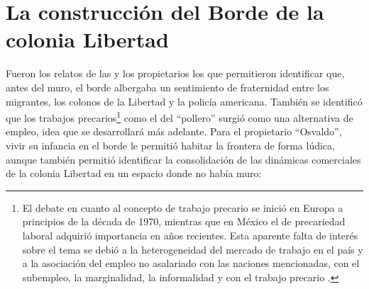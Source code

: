 \documentclass[
  spanish,
  11pt,
  a4paper,
]{scrbook}
\begin{document}
\section*{La construcción del Borde de la colonia
Libertad}\label{la-construcciuxf3n-del-borde-de-la-colonia-libertad}


Fueron los relatos de las y los propietarios los que permitieron
identificar que, antes del muro, el borde albergaba un sentimiento de
fraternidad entre los migrantes, los colonos de la Libertad y la policía
americana. También se identificó que los trabajos precarios\footnote{El
  debate en cuanto al concepto de trabajo precario se inició en Europa a
  principios de la década de 1970, mientras que en México el de
  precariedad laboral adquirió importancia en años recientes. Esta
  aparente falta de interés sobre el tema se debió a la heterogeneidad
  del mercado de trabajo en el país y a la asociación del empleo no
  asalariado con las naciones mencionadas, con el subempleo, la
  marginalidad, la informalidad y con el trabajo precario
  \autocite{Solis2014}.} como el del ``pollero'' surgió como una
alternativa de empleo, idea que se desarrollará más adelante. Para el
propietario ``Osvaldo'', vivir su infancia en el borde le permitió
habitar la frontera de forma lúdica, aunque también permitió identificar
la consolidación de las dinámicas comerciales de la colonia Libertad en
un espacio donde no había muro:
\end{document}
